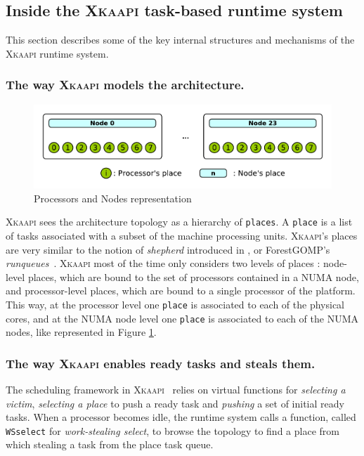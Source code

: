 \documentclass{Styles/llncs}
\newcommand{\kaapi}{\textsc{\mbox{Xkaapi}}\xspace}
\begin{document}
\subsection{Inside the \kaapi task-based runtime system}

This section describes some of the key internal structures and mechanisms of the \kaapi runtime system.

\subsubsection{The way \kaapi models the architecture.}

\begin{figure}[t]
  \centering
  \includegraphics[scale=0.5]{./figures/topology.pdf}
\caption{Processors and Nodes representation}
\label{fig:detail-topology}
\end{figure}

\kaapi sees the architecture topology as a hierarchy of \verb/places/.
A \verb/place/ is a list of tasks associated with a subset of the machine processing units.
\kaapi's places are very similar to the notion of \emph{shepherd} introduced in \cite{DBLP:journals/ijhpca/OlivierPWSP12}, or ForestGOMP's \emph{runqueues}~\cite{BroFurGogWacNam10IJPP}.
\kaapi most of the time only considers two levels of places : node-level places, which are bound to the set of processors contained in a NUMA node, and processor-level places, which are bound to a single processor of the platform.
This way, at the processor level one \verb/place/ is associated to each of the physical cores, and
at the NUMA node level one \verb/place/ is associated to each of the NUMA nodes, like represented in
Figure \ref{fig:detail-topology}.


\subsubsection{The way \kaapi enables ready tasks and steals them.}
The scheduling framework in \kaapi~\cite{Bleuse2014} relies on virtual functions for \textit{selecting a victim}, \textit{selecting a place} to push a ready task and \textit{pushing} a set of initial ready tasks.
When a processor becomes idle, the runtime system calls a function, called  \verb/WSselect/ for \emph{work-stealing select}, to browse the topology to find a place from which stealing a task from the place task queue.
\end{document}
